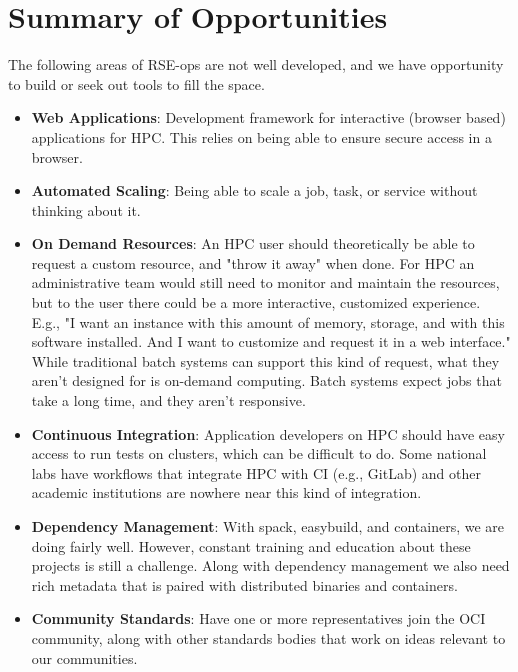\section{Summary of Opportunities}

The following areas of RSE-ops are not well developed, and we have opportunity to build or seek out tools to fill the space.

\begin{itemize}
\item \textbf{Web Applications}: Development framework for interactive (browser based) applications for HPC. This relies on being able to ensure secure access in a browser.
\item \textbf{Automated Scaling}:  Being able to scale a job, task, or service without thinking about it.
\item \textbf{On Demand Resources}: An HPC user should theoretically be able to request a custom resource, and "throw it away" when done. For HPC an administrative team would still need to monitor and maintain the resources, but to the user there could be a more interactive, customized experience. E.g., "I want an instance with this amount of memory, storage, and with this software installed. And I want to customize and request it in a web interface." While traditional batch systems can support this kind of request, what they aren't designed for is on-demand computing. Batch systems expect jobs that take a long time, and they aren't responsive.


\item \textbf{Continuous Integration}: Application developers on HPC should have easy access to run tests on clusters, which can be difficult to do. Some national labs have workflows that integrate HPC with CI (e.g., GitLab) and other academic institutions are nowhere near this kind of integration.

\item \textbf{Dependency Management}: With spack, easybuild, and containers, we are doing fairly well. However, constant training and education about these projects is still a challenge. Along with dependency management we also need rich metadata that is paired with distributed binaries and containers.

\item \textbf{Community Standards}: Have one or more representatives join the OCI community, along with other standards bodies that work on ideas relevant to our communities.


\end{itemize}

